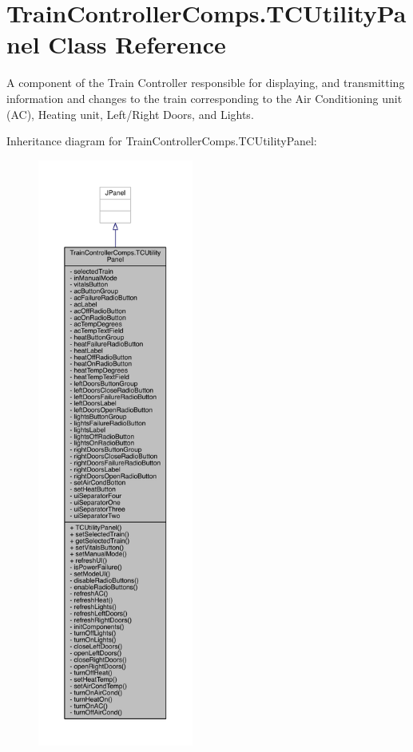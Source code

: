 \hypertarget{classTrainControllerComps_1_1TCUtilityPanel}{}\section{Train\+Controller\+Comps.\+T\+C\+Utility\+Panel Class Reference}
\label{classTrainControllerComps_1_1TCUtilityPanel}


A component of the Train Controller responsible for displaying, and transmitting information and changes to the train corresponding to the Air Conditioning unit (AC), Heating unit, Left/\+Right Doors, and Lights.  




Inheritance diagram for Train\+Controller\+Comps.\+T\+C\+Utility\+Panel\+:
\nopagebreak
\begin{figure}[H]
\begin{center}
\leavevmode
\includegraphics[height=550pt]{classTrainControllerComps_1_1TCUtilityPanel__inherit__graph}
\end{center}
\end{figure}


